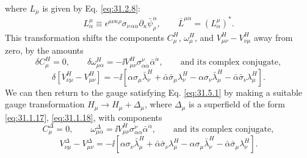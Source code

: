 where \(L_\mu\) is given by Eq. \eqref{eq:31.2.8}:
\[
  L^\mu_\alpha\equiv
  \epsilon^{\mu\nu\kappa\rho}
  \sigma_{\nu\,\alpha\dot\alpha}
  \partial_\kappa\bar\psi_\rho^{\dot\alpha},
  \qquad
  \bar L^{\mu\dot\alpha}=(L^\mu_\alpha)^* .
\]
This transformation shifts the components \(C_\mu^H\), \(\omega_\mu^H\),
and \(V_{\mu\nu}^H-V_{\nu\mu}^H\) away from zero, by the amounts
\begin{equation}
  \delta C_\mu^H=0,\qquad
  \delta\omega_{\mu\alpha}^H
  =-\ii V_{\mu\nu}^H
    \sigma^\nu_{\alpha\dot\alpha}\bar\alpha^{\dot\alpha},
  \qquad\text{and its complex conjugate},
  \tag{31.5.7}\label{eq:31.5.7}
\end{equation}
\begin{equation}
  \delta[V_{\nu\mu}^H-V_{\mu\nu}^H]
  =-\ii\left[
    \alpha\sigma_\mu\bar\lambda_\nu^H
    +\bar\alpha\bar\sigma_\mu\lambda_\nu^H
    -\alpha\sigma_\nu\bar\lambda_\mu^H
    -\bar\alpha\bar\sigma_\nu\lambda_\mu^H
  \right].
  \tag{31.5.8}\label{eq:31.5.8}
\end{equation}
We can then return to the gauge satisfying Eq. \eqref{eq:31.5.1} by
making a suitable gauge transformation \(H_\mu\longrightarrow
H_\mu+\Delta_\mu\), where \(\Delta_\mu\) is a superfield of the form
\eqref{eq:31.1.17}, \eqref{eq:31.1.18}, with components
\begin{equation}
  C_\mu^\Delta=0,\qquad
  \omega_{\mu\alpha}^\Delta
  =\ii V_{\mu\nu}^H
   \sigma^\nu_{\alpha\dot\alpha}\bar\alpha^{\dot\alpha},
  \qquad\text{and its complex conjugate},
  \tag{31.5.9}\label{eq:31.5.9}
\end{equation}
\begin{equation}
  V_{\nu\mu}^\Delta-V_{\mu\nu}^\Delta
  =-\ii\left[
    \alpha\sigma_\nu\bar\lambda_\mu^H
    +\bar\alpha\bar\sigma_\nu\lambda_\mu^H
    -\alpha\sigma_\mu\bar\lambda_\nu^H
    -\bar\alpha\bar\sigma_\mu\lambda_\nu^H
  \right].
  \tag{31.5.10}\label{eq:31.5.10}
\end{equation}

